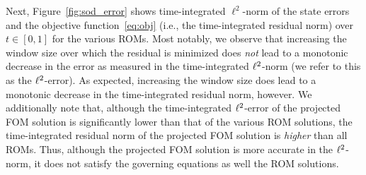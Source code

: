 Next, Figure~\ref{fig:sod_error} shows time-integrated $\ell^2$-norm of the state errors and the objective function~\eqref{eq:obj} (i.e., the time-integrated residual norm) over $t \in [0,1]$ for the various ROMs. Most notably, we observe 
that increasing the window size over which the residual is minimized does \textit{not} lead to a monotonic decrease in the error as measured in the time-integrated $\ell^2$-norm (we refer to this as the $\ell^2$-error). As expected, increasing the window size does lead to a monotonic decrease in the time-integrated residual norm, however. We additionally note that, although the time-integrated $\ell^2$-error of 
the projected FOM solution is significantly lower than that of the various ROM solutions, the time-integrated residual norm of the projected FOM solution is \textit{higher} 
than all ROMs. Thus, although the projected FOM solution is more accurate in the $\ell^2$-norm, it does not satisfy the governing equations as well the ROM solutions. 

